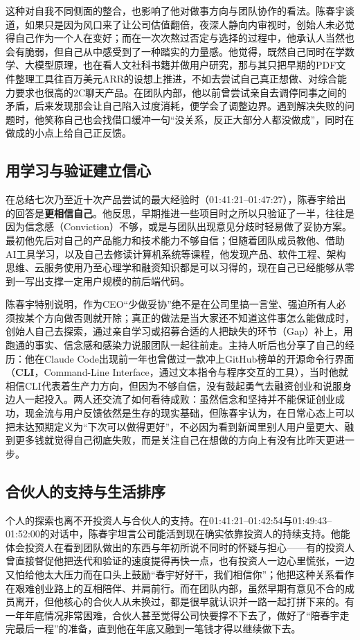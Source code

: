\documentclass[UTF8,a4paper,11pt,fontset=fandol]{ctexart}
\begin{document}
这种对自我不同侧面的整合，也影响了他对做事方向与团队协作的看法。陈春宇谈道，如果只是因为风口来了让公司估值翻倍，夜深人静向内审视时，创始人未必觉得自己作为一个人在变好；而在一次次熬过否定与选择的过程中，他承认人当然也会有脆弱，但自己从中感受到了一种踏实的力量感。他觉得，既然自己同时在学数学、大模型原理，也在看人文社科书籍并做用户研究，那与其只把早期的PDF文件整理工具往百万美元ARR的设想上推进，不如去尝试自己真正想做、对综合能力要求也很高的2C聊天产品。在团队内部，他以前曾尝试亲自去调停同事之间的矛盾，后来发现那会让自己陷入过度消耗，便学会了调整边界。遇到解决失败的问题时，他笑称自己也会找借口缓冲一句“没关系，反正大部分人都没做成”，同时在做成的小点上给自己正反馈。

\subsection{用学习与验证建立信心}
在总结七次乃至近十次产品尝试的最大经验时（01:41:21–01:47:27），陈春宇给出的回答是\textbf{更相信自己}。他反思，早期推进一些项目时之所以只验证了一半，往往是因为信念感（Conviction）不够，或是与团队出现意见分歧时轻易做了妥协方案。最初他先后对自己的产品能力和技术能力不够自信；但随着团队成员教他、借助AI工具学习，以及自己去修读计算机系统等课程，他发现产品、软件工程、架构思维、云服务使用乃至心理学和融资知识都是可以习得的，现在自己已经能够从零到一写出支撑一定用户规模的前后端代码。

陈春宇特别说明，作为CEO“少做妥协”绝不是在公司里搞一言堂、强迫所有人必须按某个方向做否则就开除；真正的做法是当大家还不知道这件事怎么能做成时，创始人自己去探索，通过亲自学习或招募合适的人把缺失的环节（Gap）补上，用跑通的事实、信念感和感染力说服团队一起往前走。主持人听后也分享了自己的经历：他在Claude Code出现前一年也曾做过一款冲上GitHub榜单的开源命令行界面（\textbf{CLI}，Command-Line Interface，通过文本指令与程序交互的工具），当时他就相信CLI代表着生产力方向，但因为不够自信，没有鼓起勇气去融资创业和说服身边人一起投入。两人还交流了如何看待成败：虽然信念和坚持并不能保证创业成功，现金流与用户反馈依然是生存的现实基础，但陈春宇认为，在日常心态上可以把未达预期定义为“下次可以做得更好”，不必因为看到新闻里别人用户量更大、融到更多钱就觉得自己彻底失败，而是关注自己在想做的方向上有没有比昨天更进一步。

\subsection{合伙人的支持与生活排序}
个人的探索也离不开投资人与合伙人的支持。在01:41:21–01:42:54与01:49:43–01:52:00的对话中，陈春宇坦言公司能活到现在确实依靠投资人的持续支持。他能体会投资人在看到团队做出的东西与年初所说不同时的怀疑与担心——有的投资人曾直接督促他把迭代和验证的速度提得再快一点，也有投资人一边心里慌张，一边又怕给他太大压力而在口头上鼓励“春宇好好干，我们相信你”；他把这种关系看作在艰难创业路上的互相陪伴、并肩前行。而在团队内部，虽然早期有意见不合的成员离开，但他核心的合伙人从未换过，都是很早就认识并一路一起打拼下来的。有一年年底情况非常困难，合伙人甚至觉得公司快要撑不下去了，做好了“陪春宇走完最后一程”的准备，直到他在年底又融到一笔钱才得以继续做下去。
\end{document}
